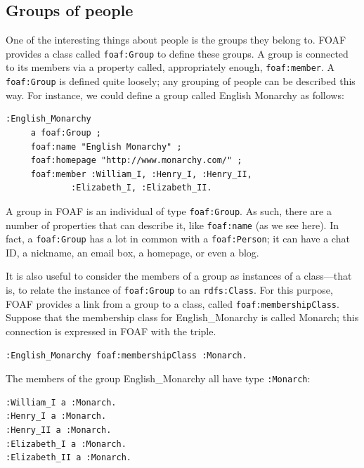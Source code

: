 \subsection{Groups of people}

One of the interesting things about people is the groups they belong to.
FOAF provides a class called \texttt{foaf:Group} to define these groups. A group
is connected to its members via a property called, appropriately enough,
\texttt{foaf:member}. A \texttt{foaf:Group} is defined quite loosely; any grouping of
people can be described this way. For instance, we could define a group
called English Monarchy as follows:

\begin{lstlisting}
:English_Monarchy
     a foaf:Group ;
     foaf:name "English Monarchy" ;
     foaf:homepage "http://www.monarchy.com/" ;
     foaf:member :William_I, :Henry_I, :Henry_II,
             :Elizabeth_I, :Elizabeth_II.
\end{lstlisting}

A group in FOAF is an individual of type \texttt{foaf:Group}. As such, there are
a number of properties that can describe it, like \texttt{foaf:name} (as we see
here). In fact, a \texttt{foaf:Group} has a lot in common with a \texttt{foaf:Person}; it
can have a chat ID, a nickname, an email box, a homepage, or even a
blog.

It is also useful to consider the members of a group as instances of a
class---that is, to relate the instance of \texttt{foaf:Group} to an \texttt{rdfs:Class}.
For this purpose, FOAF provides a link from a group to a class, called
\texttt{foaf:membershipClass}. Suppose that the membership class for
English\_Monarchy is called Monarch; this connection is expressed in
FOAF with the triple.

\begin{lstlisting}
:English_Monarchy foaf:membershipClass :Monarch.
\end{lstlisting}

The members of the group English\_Monarchy all have type \texttt{:Monarch}:

\begin{lstlisting}
:William_I a :Monarch.
:Henry_I a :Monarch.
:Henry_II a :Monarch.
:Elizabeth_I a :Monarch.
:Elizabeth_II a :Monarch.
\end{lstlisting}

